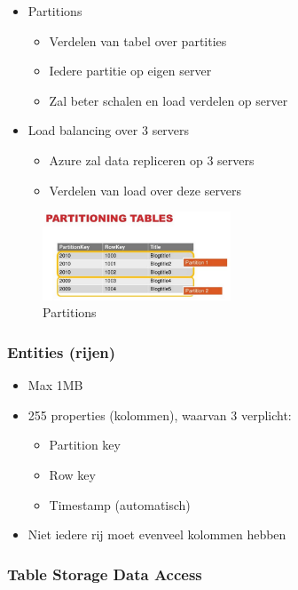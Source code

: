 \documentclass{article}
\begin{document}
\begin{itemize}
    \item Partitions
    \begin{itemize}
        \item Verdelen van tabel over partities
        \item Iedere partitie op eigen server
        \item Zal beter schalen en load verdelen op server
    \end{itemize}
    \item Load balancing over 3 servers
    \begin{itemize}
        \item Azure zal data repliceren op 3 servers
        \item Verdelen van load over deze servers
    \end{itemize}
\end{itemize}

\begin{figure}[H]
    \centering
    \includegraphics[width=0.5\textwidth]{partitioning-tables.png}
    \caption{Partitions}
\end{figure}

\subsubsection{Entities (rijen)}

\begin{itemize}
    \item Max 1MB
    \item 255 properties (kolommen), waarvan 3 verplicht:
    \begin{itemize}
        \item Partition key
        \item Row key
        \item Timestamp (automatisch)
    \end{itemize}
    \item Niet iedere rij moet evenveel kolommen hebben
\end{itemize}

\subsubsection{Table Storage Data Access}
\end{document}
